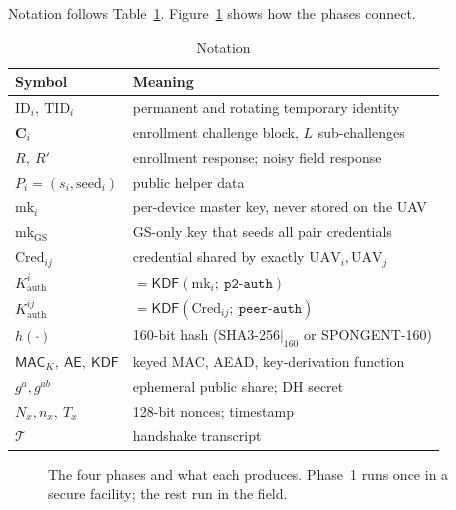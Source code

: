 \documentclass[conference]{IEEEtran}
\begin{document}
Notation follows Table~\ref{tab:notation}. Figure~\ref{fig:overview} shows how
the phases connect.

\begin{table}[H]
\centering
\caption{Notation}
\label{tab:notation}
\footnotesize
\begin{tabular}{@{}ll@{}}
\toprule
\textbf{Symbol} & \textbf{Meaning} \\
\midrule
$\text{ID}_i,\ \text{TID}_i$ & permanent and rotating temporary identity \\
$\bm{C}_i$ & enrollment challenge block, $L$ sub-challenges \\
$R,\ R'$ & enrollment response; noisy field response \\
$P_i = (s_i, \text{seed}_i)$ & public helper data \\
$\text{mk}_i$ & per-device master key, never stored on the UAV \\
$\text{mk}_{\text{GS}}$ & GS-only key that seeds all pair credentials \\
$\text{Cred}_{ij}$ & credential shared by exactly $\text{UAV}_i,\text{UAV}_j$ \\
$K^{i}_{\text{auth}}$ & $= \mathsf{KDF}(\text{mk}_i;\ \texttt{p2-auth})$ \\
$K^{ij}_{\text{auth}}$ & $= \mathsf{KDF}(\text{Cred}_{ij};\ \texttt{peer-auth})$ \\
$h(\cdot)$ & 160-bit hash (SHA3-256$|_{160}$ or SPONGENT-160) \\
$\mathsf{MAC}_K,\ \mathsf{AE},\ \mathsf{KDF}$ & keyed MAC, AEAD, key-derivation function \\
$g^{a}, g^{ab}$ & ephemeral public share; DH secret \\
$N_x, n_x,\ T_x$ & 128-bit nonces; timestamp \\
$\mathcal{T}$ & handshake transcript \\
\bottomrule
\end{tabular}
\end{table}

\begin{figure}[H]
\centering
{}
\caption{The four phases and what each produces. Phase~1 runs once in a secure
facility; the rest run in the field.}
\label{fig:overview}
\end{figure}
\end{document}
